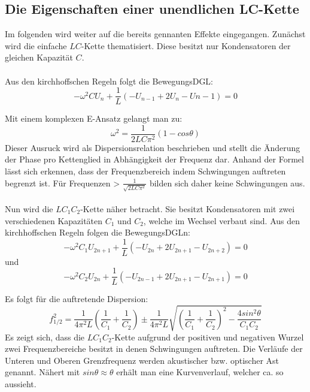 \subsection{Die Eigenschaften einer unendlichen LC-Kette}


Im folgenden wird weiter auf die bereits gennanten Effekte eingegangen. Zunächst
 wird die einfache $LC$-Kette thematisiert. Diese besitzt nur Kondensatoren der
 gleichen Kapazität $C$.\\\\

Aus den kirchhoffschen Regeln folgt die BewegungsDGL:
\begin{equation}
- \omega ^2 C U_n + \frac{1}{L} \left( -U_{n-1} + 2U_ n -U{n-1} \right) = 0
\end{equation}

Mit einem komplexen E-Ansatz gelangt man zu:
\begin{equation}
\omega ^2 = \frac{1}{2LC\pi^2}(1-cos\theta)
\end{equation}
Dieser Ausruck wird als Dispersionsrelation beschrieben und stellt die Änderung
 der Phase pro Kettenglied in Abhängigkeit der Frequenz dar. Anhand der Formel lässt sich erkennen,
  dass der Frequenzbereich indem Schwingungen auftreten begrenzt ist. Für Frequenzen >
 $\frac{1}{\sqrt{2LC\pi^2}}$ bilden sich daher keine Schwingungen aus.\\\\

 Nun wird die $LC_1C_2$-Kette näher betracht. Sie besitzt Kondensatoren mit zwei
  verschiedenen Kapazitäten $C_1$ und $C_2$, welche im Wechsel verbaut sind.
 Aus den kirchhoffschen Regeln folgen die BewegungsDGLn:
 \begin{equation}
   -\omega^2 C_1 U_{2n+1} + \frac{1}{L} \left( -U_{2n} + 2U_{2n+1} - U_{2n+2} \right) = 0
 \end{equation}
 und
 \begin{equation}
   -\omega^2 C_2 U_{2n} + \frac{1}{L} \left( -U_{2n-1} + 2U_{2n+1} - U_{2n+1} \right) = 0
 \end{equation}

Es folgt für die auftretende Dispersion:
\begin{equation}
  f_{1/2}^2 = \frac{1}{4\pi^2L}\left(\frac{1}{C_1}+\frac{1}{C_2}\right) \pm \frac{1}{4\pi^2L}\sqrt{\left(\frac{1}{C_1}+\frac{1}{C_2} \right)^2 - \frac{4 sin^2\theta}{C_1C_2}}
\end{equation}
Es zeigt sich, dass die $LC_1C_2$-Kette aufgrund der positiven und negativen Wurzel
zwei Frequenzbereiche besitzt in denen Schwingungen auftreten. Die Verläufe der Unteren und Oberen
 Grenzfrequenz werden akustischer bzw. optischer Ast genannt. Nähert mit
  $sin \theta \approx \theta$ erhält man eine Kurvenverlauf, welcher ca. so aussieht.

